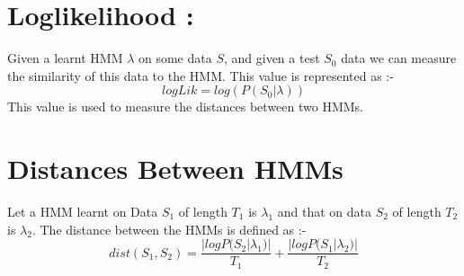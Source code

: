 \def\DevnagVersion{2.15}\documentclass[a4paper, 11pt, notitlepage]{report}
\begin{document}
\hspace*{10pt} \section{Loglikelihood :}
Given a learnt HMM $\lambda $ on some data $S$, and given a test $S_0$ data we can measure the similarity of this data to the HMM. This value is represented as :- \\
$$logLik = log(P(S_0 | \lambda))$$
This value is used to measure the distances between two HMMs.\\
\hspace*{10pt} \section{Distances Between HMMs}
\label{sec:distHMM}
Let a HMM learnt on Data $S_1$ of length $T_1$ is $\lambda _1$ and that on data $S_2$ of length $T_2$ is $\lambda _ 2$. The distance between the HMMs is defined as :- \\

$$dist(S_1, S_2) = \frac{|logP(S_2|\lambda _ 1)|}{T_1} +\frac{|logP(S_1|\lambda _ 2)|}{T_2} $$
  



\end{document}
